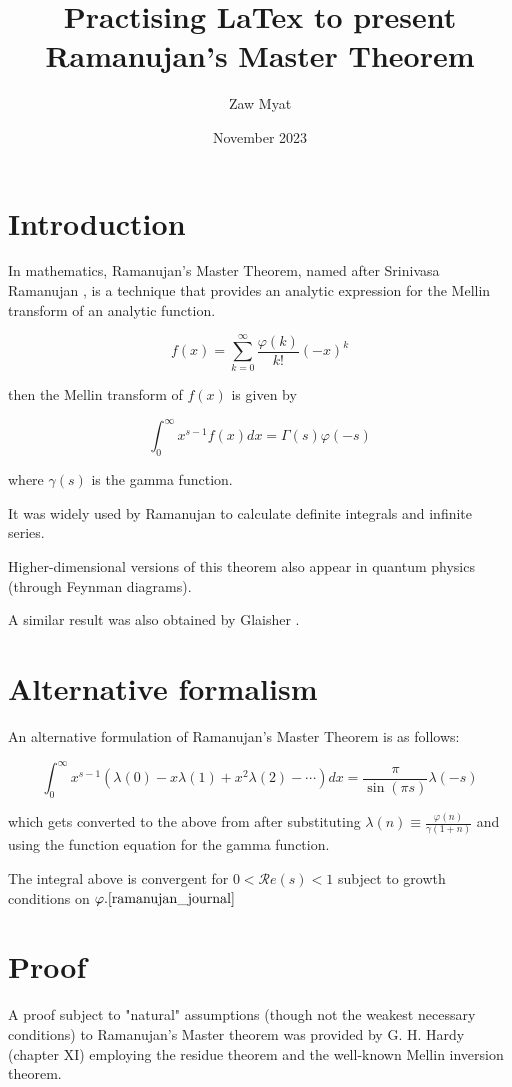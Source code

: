 \documentclass{article}
\title{Practising LaTex to present Ramanujan's Master Theorem}
\author{Zaw Myat}
\date{November 2023}
\begin{document}
\maketitle

\section{Introduction}

In mathematics, Ramanujan's Master Theorem, named after Srinivasa Ramanujan \cite{ramanujan_notebook}, is a technique that provides an analytic expression for the Mellin transform of an analytic function.

$$
f(x) = \sum_{k=0}^\infty \frac{\varphi(k)}{k!} (-x)^k
$$

then the Mellin transform of $f(x)$ is given by

$$
 \int_0^\infty x^{s-1}f(x)dx = \Gamma(s) \varphi(-s)
$$

where $\gamma(s)$  is the gamma function.

It was widely used by Ramanujan to calculate definite integrals and infinite series.

Higher-dimensional versions of this theorem also appear in quantum physics (through Feynman diagrams).\cite{citation2}

A similar result was also obtained by Glaisher \cite{glaisher_jwl}.

\section{Alternative formalism}

An alternative formulation of Ramanujan's Master Theorem is as follows:

$$
 \int_0^\infty x^{s-1} \left(\lambda(0) - x\lambda(1)+x^2 \lambda(2)-\cdots\right)dx  = \frac{\pi}{\sin(\pi s) }\lambda(-s)
$$

which gets converted to the above from after substituting $\lambda(n) \equiv \frac{\varphi (n)}{\gamma (1+n)}$ and using the function equation for the gamma function.

The integral above is convergent for $0 < \mathcal{R} e (s) < 1$ subject to growth conditions on ${\varphi}. \cite{ramanujan_journal}$

\section{Proof}
A proof subject to "natural" assumptions (though not the weakest necessary conditions) to Ramanujan's Master theorem was provided by G. H. Hardy\cite{hardy} (chapter XI) employing the residue theorem and the well-known Mellin inversion theorem.
\end{document}
